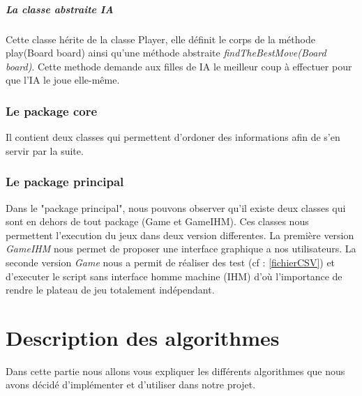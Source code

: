 \documentclass{report}
\begin{document}
              \paragraph{La classe abstraite IA}
              Cette classe hérite de la classe Player, elle définit le corps de la méthode play(Board board) ainsi qu'une méthode abstraite \textit{findTheBestMove(Board board)}.
              Cette methode demande aux filles de IA le meilleur coup à effectuer pour que l'IA le joue elle-même.

			\subsection{Le package core}\label{pckCore}
			Il contient deux classes qui permettent d'ordoner des informations afin de s'en servir par la suite.

			\subsection{Le package principal}
			Dans le "package principal", nous pouvons observer qu'il existe deux classes qui sont en dehors de tout package (Game et GameIHM).
			Ces classes nous permettent l'execution du jeux dans deux version differentes.
			La première version \textit{GameIHM} nous permet de proposer une interface graphique a nos utilisateurs.
			La seconde version \textit{Game} nous a permit de réaliser des test (cf : \ref{fichierCSV}) et d'executer le script sans
			interface homme machine (IHM) d'où l'importance de rendre le plateau de jeu totalement indépendant.
			
	\chapter{Description des algorithmes}
	Dans cette partie nous allons vous expliquer les différents algorithmes que nous avons décidé d'implémenter et d'utiliser dans notre projet.
\end{document}
